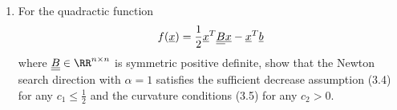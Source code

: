 \documentclass[11pt, oneside]{article}
\begin{document}
\begin{enumerate}
\begin{proof}
\begin{align*}
\begin{bmatrix}
          & & & \M{Q}_n
        \end{bmatrix}
        \begin{bmatrix}
          \M{\Lambda}_1 & & & \\
          & \M{\Lambda}_2 & & \\
          & & \ddots & \\
          & & & \M{\Lambda}_n
        \end{bmatrix}
        \begin{bmatrix}
          \M{Q}_1^{-1} & & & \\
          & \M{Q}_2^{-1} & & \\
          & & \ddots & \\
          & & & \M{Q}_n^{-1}
        \end{bmatrix} \\
        &=
        \begin{bmatrix}
          \M{Q}_1 \M{\Lambda}_1 \M{Q}_1^{-1}& & & \\
          & \M{Q}_2 \M{\Lambda}_2 \M{Q}_2^{-1}& & \\
          & & \ddots & \\
          & & & \M{Q}_n\M{\Lambda}_n\M{Q}_n^{-1}
        \end{bmatrix} \\
        &=
        \begin{bmatrix}
          \M{B}_1 & & & \\
          & \M{B}_2 & & \\
          & & \ddots & \\
          & & & \M{B}_n
        \end{bmatrix} \\
        &= \M{B}
      \end{align*}
      This shows that the eigenvalues of $\M{B}$ are the union of the eigenvalues
      of the matrices $\M{B}_k$.
      Also the eigenvectors of $\M{B}$ are related to the eigenvectors of
      $\M{B}$.
      The eigenvectors of $\M{B}$ are the columns of $\M{Q}$, so they are the
      eigenvectors of $\M{B}_k$ but embedded in zeroes in the proper way.
    \end{proof}

  \item %
    For the quadractic function
    \[
      f(\underline{x}) = \frac{1}{2} \underline{x}^T \underline{\underline{B}} \underline{x} - \underline{x}^T \underline{b}
    \]
    where $\M{B} \in \RR^{n \times n}$ is symmetric positive definite, show that
    the Newton search direction with $\alpha = 1$ satisfies the sufficient
    decrease assumption (3.4) for any $c_1 \le \frac{1}{2}$ and the curvature
    conditions (3.5) for any $c_2 > 0$.


\end{enumerate}
\end{document}
